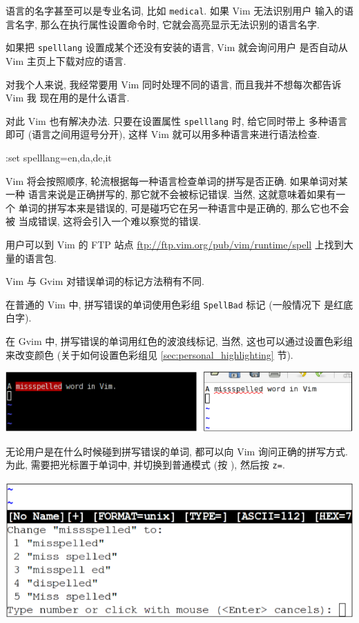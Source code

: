 \begin{warning}
语言的名字甚至可以是专业名词, 比如 \texttt{medical}. 如果 Vim 无法识别用户
输入的语言名字, 那么在执行属性设置命令时, 它就会高亮显示无法识别的语言名字.

\begin{warning}
    如果把 \texttt{spelllang} 设置成某个还没有安装的语言, Vim 就会询问用户
    是否自动从 Vim 主页上下载对应的语言.
\end{warning}

对我个人来说, 我经常要用 Vim 同时处理不同的语言, 而且我并不想每次都告诉 Vim 我
现在用的是什么语言.

对此 Vim 也有解决办法. 只要在设置属性 \texttt{spelllang} 时, 给它同时带上
多种语言即可 (语言之间用逗号分开), 这样 Vim 就可以用多种语言来进行语法检查.
\begin{vimcmd}
:set spelllang=en,da,de,it
\end{vimcmd}
Vim 将会按照顺序, 轮流根据每一种语言检查单词的拼写是否正确. 如果单词对某一种
语言来说是正确拼写的, 那它就不会被标记错误. 当然, 这就意味着如果有一个
单词的拼写本来是错误的, 可是碰巧它在另一种语言中是正确的, 那么它也不会被
当成错误, 这将会引入一个难以察觉的错误.

\begin{warning}
    用户可以到 Vim 的 FTP 站点 \url{ftp://ftp.vim.org/pub/vim/runtime/spell}
    上找到大量的语言包.
\end{warning}

Vim 与 Gvim 对错误单词的标记方法稍有不同.

在普通的 Vim 中, 拼写错误的单词使用色彩组 \texttt{SpellBad} 标记 (一般情况下 
是红底白字).

在 Gvim 中, 拼写错误的单词用红色的波浪线标记, 当然, 这也可以通过设置色彩组
来改变颜色 (关于如何设置色彩组见 \ref{sec:personal_highlighting} 节).

\begin{center}
    \includegraphics[scale=0.6]{./images/page42-1.png}
\end{center}

无论用户是在什么时候碰到拼写错误的单词, 都可以向 Vim 询问正确的拼写方式.
为此, 需要把光标置于单词中, 并切换到普通模式 (按 ), 然后按
\texttt{z=}.

\begin{center}
    \includegraphics[scale=0.6]{./images/page42-2.png}
\end{center}


\end{warning}
